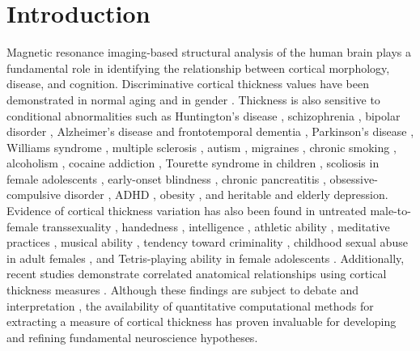 \section{Introduction}

Magnetic resonance imaging-based 
structural analysis of the human brain plays a fundamental role
in identifying the relationship between cortical morphology, disease, and cognition.
Discriminative cortical thickness values 
have been demonstrated in normal aging \citep{Lemaitre2012,Chen2011,kochunov2011,Walhovd2013} and in gender \citep{amunts2007,luders2006a}.
Thickness is also sensitive to conditional abnormalities such as
Huntington's disease \citep{rosas2002,rosas2005,selemon2004}, 
schizophrenia \citep{nesvag2008}, bipolar disorder \citep{lyoo2006}, Alzheimer's disease and frontotemporal
dementia \citep{du2007,dickerson2009}, Parkinson's disease \citep{jubault2011}, Williams syndrome \citep{thompson2005},
multiple sclerosis \citep{ramasamy2009}, autism \citep{chung2005,hardan2006},
migraines \citep{dasilva2007}, chronic smoking \citep{kuhn2010}, alcoholism \citep{fortier2011},
cocaine addiction \citep{makris2008}, Tourette syndrome in children \citep{sowell2008},
scoliosis in
female adolescents \citep{wang2012}, 
early-onset blindness \citep{jiang2009},
chronic pancreatitis \citep{frokjaer2012},
obsessive-compulsive disorder \citep{shin2007}, ADHD \citep{almeida-montes2012}, obesity \citep{raji2010}, 
and heritable \citep{peterson2009}
and elderly \citep{ballmaier2004} depression.  Evidence of cortical thickness 
variation has also been found in untreated
male-to-female transsexuality \citep{luders2012},  handedness
\citep{luders2006,amunts2007}, intelligence \citep{shaw2006}, athletic
ability \citep{wei2011}, meditative practices \citep{lazar2005}, musical ability \citep{bermudez2009,foster2010}, 
tendency toward criminality \citep{raine2011}, 
childhood sexual abuse in adult females \citep{heim2013},
and Tetris-playing
ability in female adolescents \citep{haier2009}.  Additionally,
recent studies demonstrate correlated anatomical
relationships using cortical thickness measures
\citep{worsley2005,lerch2006,he2007,chen2008}.
Although these findings
are subject to debate and interpretation \citep{gernsbacher2007}, 
the availability of quantitative
computational methods for extracting a measure of cortical thickness
has proven invaluable for developing and refining fundamental 
neuroscience hypotheses.

